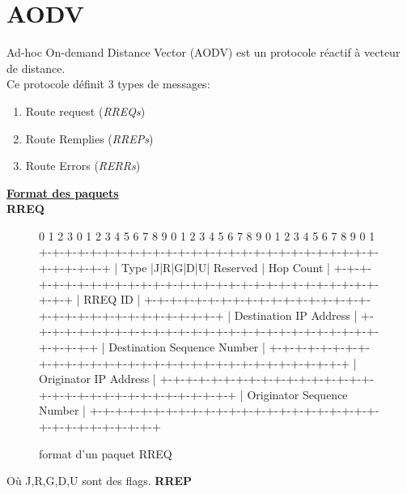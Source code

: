 \chapter{AODV}
    Ad-hoc On-demand Distance Vector (AODV) est un protocole réactif à vecteur de distance.\\
    Ce protocole définit 3 types de messages:
    \begin{enumerate}
        \item Route request (\textit{RREQs})
        \item Route Remplies (\textit{RREPs})
        \item Route Errors (\textit{RERRs})
    \end{enumerate}

    \underline{\textbf{Format des paquets}}\\
        \textbf{RREQ}
        \begin{figure}[H]
        \centering
            \begin{verbatimtab}
 0                   1                   2                   3
 0 1 2 3 4 5 6 7 8 9 0 1 2 3 4 5 6 7 8 9 0 1 2 3 4 5 6 7 8 9 0 1
+-+-+-+-+-+-+-+-+-+-+-+-+-+-+-+-+-+-+-+-+-+-+-+-+-+-+-+-+-+-+-+-+
|     Type      |J|R|G|D|U|   Reserved          |   Hop Count   |
+-+-+-+-+-+-+-+-+-+-+-+-+-+-+-+-+-+-+-+-+-+-+-+-+-+-+-+-+-+-+-+-+
|                            RREQ ID                            |
+-+-+-+-+-+-+-+-+-+-+-+-+-+-+-+-+-+-+-+-+-+-+-+-+-+-+-+-+-+-+-+-+
|                    Destination IP Address                     |
+-+-+-+-+-+-+-+-+-+-+-+-+-+-+-+-+-+-+-+-+-+-+-+-+-+-+-+-+-+-+-+-+
|                  Destination Sequence Number                  |
+-+-+-+-+-+-+-+-+-+-+-+-+-+-+-+-+-+-+-+-+-+-+-+-+-+-+-+-+-+-+-+-+
|                    Originator IP Address                      |
+-+-+-+-+-+-+-+-+-+-+-+-+-+-+-+-+-+-+-+-+-+-+-+-+-+-+-+-+-+-+-+-+
|                  Originator Sequence Number                   |
+-+-+-+-+-+-+-+-+-+-+-+-+-+-+-+-+-+-+-+-+-+-+-+-+-+-+-+-+-+-+-+-+
            \end{verbatimtab}
        \caption{format d'un paquet RREQ \cite{aodv_w}}
        \label{rreqPaquet}
    \end{figure}
    Où J,R,G,D,U sont des flags.
        \newpage
        \textbf{RREP}
